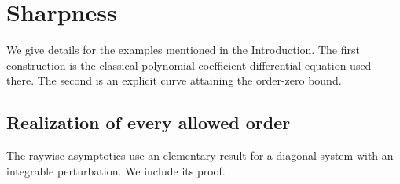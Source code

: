 \documentclass[11pt,letterpaper,reqno]{amsart}
\theoremstyle{remark}
\numberwithin{equation}{section}
\begin{document}
\section{Sharpness}\label{sec:sharpness}

We give details for the examples mentioned in the Introduction. The first
construction is the classical polynomial-coefficient differential equation
used there. The second is an explicit curve attaining the order-zero bound.

\subsection{Realization of every allowed order}

The raywise asymptotics use an elementary result for a diagonal system
with an integrable perturbation. We include its proof.
\end{document}
